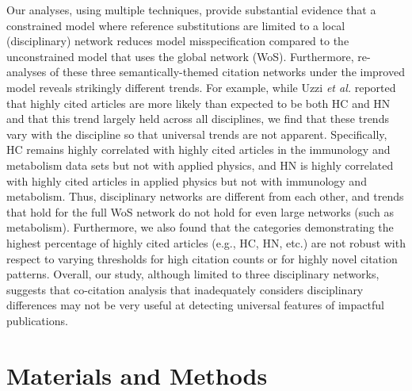 \documentclass[NETN]{stjour}
\begin{document}
Our analyses, using multiple techniques, provide substantial evidence that a constrained model where reference substitutions are limited to a local (disciplinary) network reduces model misspecification compared to the unconstrained model that uses the global network (WoS). Furthermore, re-analyses of these three semantically-themed citation networks  under the improved model reveals strikingly different trends. For example, while Uzzi {\em et al.} reported that highly cited articles are more likely than expected to be both HC and HN and that this trend largely held across all disciplines, we find that these trends vary with the discipline so that universal trends are not apparent. Specifically,  HC remains highly correlated with highly cited articles in the immunology and metabolism data sets but not with applied physics, and HN is highly correlated with highly cited articles in applied physics but not with immunology and metabolism.  Thus, disciplinary networks are different from each other, and trends that hold for the full WoS network do not hold for even large networks (such as metabolism).  Furthermore, we also found that the categories  demonstrating the highest percentage of highly cited articles (e.g., HC, HN, etc.) are not robust with respect to varying thresholds for high citation counts or for highly novel citation patterns. Overall, our study, although limited to three disciplinary networks, suggests that co-citation analysis that inadequately considers disciplinary differences may not be very useful at detecting universal features of impactful publications.

\section{Materials and Methods}
\end{document}
